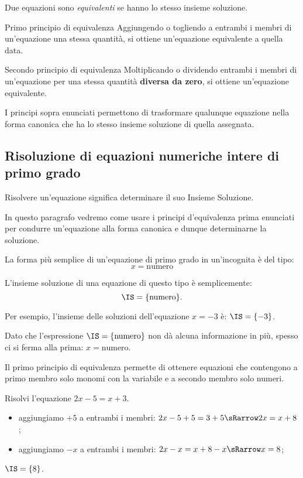 \begin{definizione}{}{}
Due equazioni sono \emph{equivalenti} se hanno lo stesso insieme soluzione.
\end{definizione}

\begin{teorema}{Primo principio di equivalenza}{}
Aggiungendo o togliendo a entrambi i membri di un'equazione 
una stessa quantità, 
si ottiene un'equazione equivalente a quella data.
\end{teorema}

\begin{teorema}{Secondo principio di equivalenza}{}
Moltiplicando o dividendo entrambi i membri di un'equazione 
per una stessa quantità \textbf{diversa da zero}, 
si ottiene un'equazione equivalente.
\end{teorema}

I principi sopra enunciati permettono di trasformare qualunque equazione
nella forma canonica che ha lo stesso insieme soluzione di quella
assegnata.

\subsection{Risoluzione di equazioni numeriche intere di primo grado}

\begin{definizione}{}{}
Risolvere un'equazione significa determinare il suo Insieme Soluzione.
\end{definizione}

In questo paragrafo vedremo come usare i principi
d'equivalenza prima enunciati per condurre
un'equazione alla forma canonica e dunque determinarne
la soluzione.

La forma più semplice di un'equazione di primo grado in
un'incognita è del tipo:
\[x = \text{numero}\]

L'insieme soluzione di una
equazione di questo tipo è semplicemente:
\[\IS=\{\text{numero}\}.\]

Per esempio, l'insieme delle soluzioni dell'equazione
\(x = -3\) è: \(\IS =\{-3\}\).

Dato che l'espressione \(\IS=\{\text{numero}\}\) non dà alcuna 
informazione in più, 
spesso ci si ferma alla prima: \(x = \text{numero}\).

Il primo principio di equivalenza permette di ottenere equazioni che 
contengono a primo membro solo monomi con la variabile e a secondo membro 
solo numeri. 

\begin{esempio}{}{}
Risolvi l'equazione \(2x -5 = x +3\).

\vspace{.5em}
\begin{itemize}[left=0mm, nosep]
\item aggiungiamo \(+5\) a entrambi i membri:
\(2x -5 +5 = 3 +5 \sRarrow 2x = x +8\);
\item aggiungiamo \(-x\) a entrambi i membri:
\(2x-x=x +8 -x \sRarrow x=8\);
\end{itemize}

\(\IS =\{8\}\).
\end{esempio}

